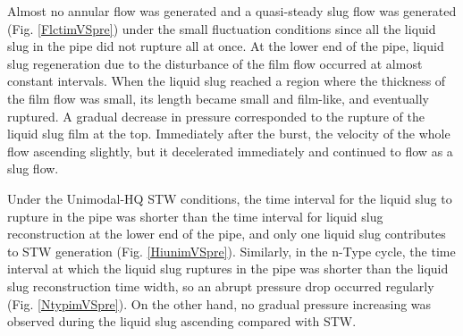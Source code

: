 \documentclass[aps,pre,preprint,groupedaddress,showkeys]{revtex4-2}
\begin{document}
Almost no annular flow was generated and a quasi-steady slug flow was generated (Fig. \ref{FlctimVSpre}) under the small fluctuation conditions since all the liquid slug in the pipe did not rupture all at once.
At the lower end of the pipe, liquid slug regeneration due to the disturbance of the film flow occurred at almost constant intervals. 
When the liquid slug reached a region where the thickness of the film flow was small, its length became small and film-like, and eventually ruptured.
A gradual decrease in pressure corresponded to the rupture of the liquid slug film at the top.
Immediately after the burst, the velocity of the whole flow ascending slightly, but it decelerated immediately and continued to flow as a slug flow.

Under the Unimodal-HQ STW conditions, the time interval for the liquid slug to rupture in the pipe was shorter than the time interval for liquid slug reconstruction at the lower end of the pipe, and only one liquid slug contributes to STW generation (Fig. \ref{HiunimVSpre}).
Similarly, in the n-Type cycle, the time interval at which the liquid slug ruptures in the pipe was shorter than the liquid slug reconstruction time width, so an abrupt pressure drop occurred regularly (Fig. \ref{NtypimVSpre}).
On the other hand, no gradual pressure increasing was observed during the liquid slug ascending compared with STW.
\end{document}
